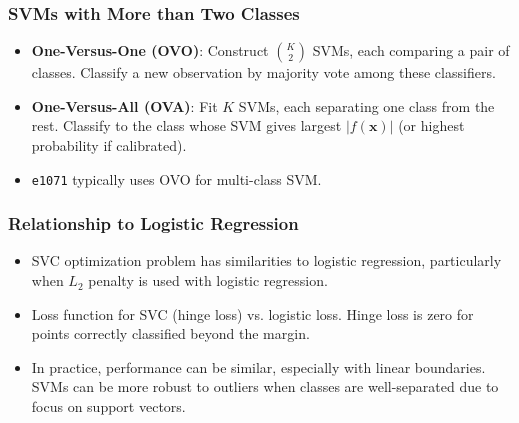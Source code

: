 \documentclass[12pt,a4paper]{article}
\newcommand{\Rpackage}[1]{\texttt{#1}} %
\begin{document}
    \subsubsection{SVMs with More than Two Classes }
        \begin{itemize}
            \item \textbf{One-Versus-One (OVO)}: Construct $\binom{K}{2}$ SVMs, each comparing a pair of classes. Classify a new observation by majority vote among these classifiers.
            \item \textbf{One-Versus-All (OVA)}: Fit $K$ SVMs, each separating one class from the rest. Classify to the class whose SVM gives largest $|f(\mathbf{x})|$ (or highest probability if calibrated).
            \item \Rpackage{e1071} typically uses OVO for multi-class SVM.
        \end{itemize}

    \subsubsection{Relationship to Logistic Regression }
        \begin{itemize}
            \item SVC optimization problem has similarities to logistic regression, particularly when $L_2$ penalty is used with logistic regression.
            \item Loss function for SVC (hinge loss) vs. logistic loss. Hinge loss is zero for points correctly classified beyond the margin.
            \item In practice, performance can be similar, especially with linear boundaries. SVMs can be more robust to outliers when classes are well-separated due to focus on support vectors.
        \end{itemize}
\end{document}
